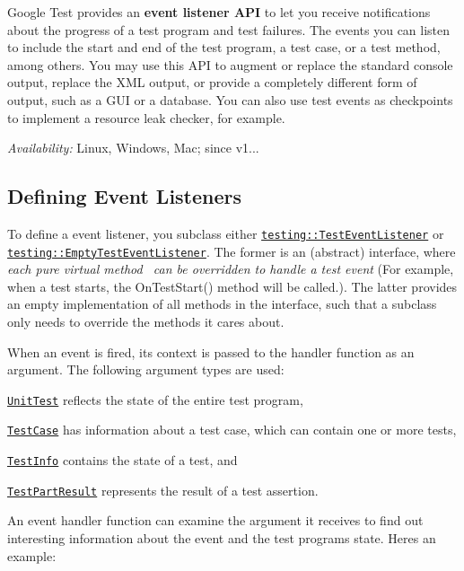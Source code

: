 Google Test provides an {\bfseries event listener A\+PI} to let you receive notifications about the progress of a test program and test failures. The events you can listen to include the start and end of the test program, a test case, or a test method, among others. You may use this A\+PI to augment or replace the standard console output, replace the X\+ML output, or provide a completely different form of output, such as a G\+UI or a database. You can also use test events as checkpoints to implement a resource leak checker, for example.

{\itshape Availability\+:} Linux, Windows, Mac; since v1...

\subsection*{Defining Event Listeners}

To define a event listener, you subclass either \href{../include/gtest/gtest.h#L855}{\tt testing\+::\+Test\+Event\+Listener} or \href{../include/gtest/gtest.h#L905}{\tt testing\+::\+Empty\+Test\+Event\+Listener}. The former is an (abstract) interface, where {\itshape each pure virtual method~\newline
 can be overridden to handle a test event} (For example, when a test starts, the {\ttfamily On\+Test\+Start()} method will be called.). The latter provides an empty implementation of all methods in the interface, such that a subclass only needs to override the methods it cares about.

When an event is fired, its context is passed to the handler function as an argument. The following argument types are used\+:
\begin{DoxyItemize}
\item \href{../include/gtest/gtest.h#L1007}{\tt Unit\+Test} reflects the state of the entire test program,
\item \href{../include/gtest/gtest.h#L689}{\tt Test\+Case} has information about a test case, which can contain one or more tests,
\item \href{../include/gtest/gtest.h#L599}{\tt Test\+Info} contains the state of a test, and
\item \href{../include/gtest/gtest-test-part.h#L42}{\tt Test\+Part\+Result} represents the result of a test assertion.
\end{DoxyItemize}

An event handler function can examine the argument it receives to find out interesting information about the event and the test program\textquotesingle{}s state. Here\textquotesingle{}s an example\+:


